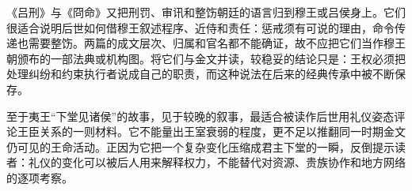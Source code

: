 《吕刑》与《冏命》又把刑罚、审讯和整饬朝廷的语言归到穆王或吕侯身上。它们很适合说明后世如何借穆王叙述程序、近侍和责任：惩戒须有可说的理由，命令传递也需要整饬。两篇的成文层次、归属和官名都不能确证，故不应把它们当作穆王朝颁布的一部法典或机构图。将它们与金文并读，较稳妥的结论只是：王权必须把处理纠纷和约束执行者说成自己的职责，而这种说法在后来的经典传承中被不断保存。

至于夷王“下堂见诸侯”的故事，见于较晚的叙事，最适合被读作后世用礼仪姿态评论王臣关系的一则材料。它不能量出王室衰弱的程度，更不足以推翻同一时期金文仍可见的王命活动。正因为它把一个复杂变化压缩成君主下堂的一瞬，反倒提示读者：礼仪的变化可以被后人用来解释权力，不能替代对资源、贵族协作和地方网络的逐项考察。
